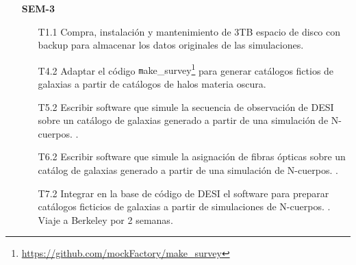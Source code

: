 \begin{itemize}
\begin{itemize}
\item[T2.1] \gradA Generar las condiciones iniciales para 5 vol\'umenes
  cosmol\'ogicos. 
\item[T2.2] \gradA Correr las simulaciones para 5 vol\'umenes LCDM.
\item[T2.3] \gradA Controlar la calidad de los 5 vol\'umenes LCDM.  
Esto se har\'a con la asesor\'ia de Dr. Stefan Gottloeber.
\item[T2.4] \gradA Identificar los halos de materia oscura en los 5
  vol\'umenes LCDM.
\item[T8.1] \gradB Medir la intensidad del efecto AP sobre cat\'alogos
  ficticios de galaxias creados a partir de simulaciones de N-cuerpos.\park
\item[T8.2] \prof Medir la intensidad del efecto AP sobre observaciones
  reales de galaxias. \park. Viaje a Seul por dos semanas.
\end{itemize}


\item[\bf SEM-3]
\begin{itemize}
\item[T1.1] \tecn Compra, instalaci\'on y mantenimiento de 3TB espacio de disco
  con backup para almacenar los datos originales de las simulaciones.
\item[T4.2] \gradA\prof Adaptar el c\'odigo {\texttt
  make\_survey}\footnote{\url{https://github.com/mockFactory/make_survey}}
  para generar  cat\'alogos fictios de galaxias a partir de
  cat\'alogos de halos materia oscura. 
\item[T5.2] \prof Escribir software que simule la secuencia de observaci\'on
  de DESI sobre un cat\'alogo de galaxias generado a partir de una
  simulaci\'on de N-cuerpos. \bob.
\item[T6.2] \prof Escribir software que simule la asignaci\'on de fibras
  \'opticas sobre un cat\'alog de galaxias generado a partir de una
  simulaci\'on de N-cuerpos. \bob.
\item[T7.2] \gradA\prof Integrar en la base de c\'odigo de DESI el software para
  preparar cat\'alogos ficticios de galaxias a partir de simulaciones
  de N-cuerpos. \bob. Viaje a Berkeley por 2 semanas.
\end{itemize}


\end{itemize}

